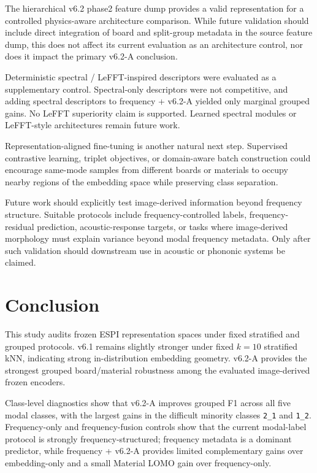 \documentclass[review,3p,times]{elsarticle}
\begin{document}
The hierarchical v6.2 phase2 feature dump provides a valid representation for a controlled physics-aware architecture comparison. While future validation should include direct integration of board and split-group metadata in the source feature dump, this does not affect its current evaluation as an architecture control, nor does it impact the primary v6.2-A conclusion.

Deterministic spectral / LeFFT-inspired descriptors were evaluated as a supplementary control. Spectral-only descriptors were not competitive, and adding spectral descriptors to frequency + v6.2-A yielded only marginal grouped gains. No LeFFT superiority claim is supported. Learned spectral modules or LeFFT-style architectures remain future work.

Representation-aligned fine-tuning is another natural next step. Supervised contrastive learning, triplet objectives, or domain-aware batch construction could encourage same-mode samples from different boards or materials to occupy nearby regions of the embedding space while preserving class separation.

Future work should explicitly test image-derived information beyond frequency structure. Suitable protocols include frequency-controlled labels, frequency-residual prediction, acoustic-response targets, or tasks where image-derived morphology must explain variance beyond modal frequency metadata. Only after such validation should downstream use in acoustic or phononic systems be claimed.

\section{Conclusion}
\label{sec:conclusion}

This study audits frozen ESPI representation spaces under fixed stratified and grouped protocols. v6.1 remains slightly stronger under fixed $k=10$ stratified kNN, indicating strong in-distribution embedding geometry. v6.2-A provides the strongest grouped board/material robustness among the evaluated image-derived frozen encoders.

Class-level diagnostics show that v6.2-A improves grouped F1 across all five modal classes, with the largest gains in the difficult minority classes \texttt{2\_1} and \texttt{1\_2}. Frequency-only and frequency-fusion controls show that the current modal-label protocol is strongly frequency-structured; frequency metadata is a dominant predictor, while frequency + v6.2-A provides limited complementary gains over embedding-only and a small Material LOMO gain over frequency-only.
\end{document}
